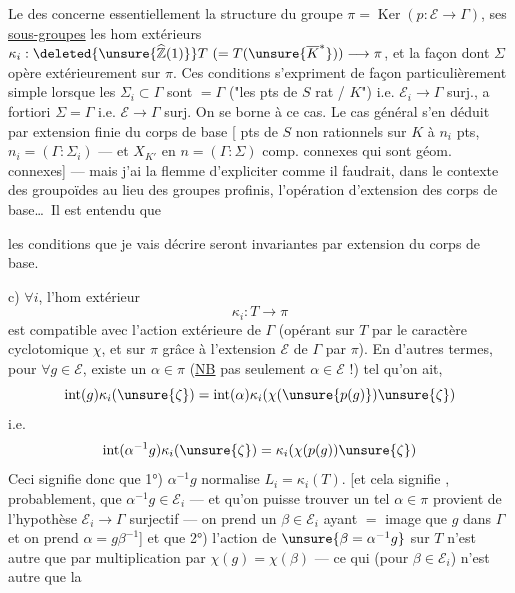 Le  des  concerne
essentiellement la structure du groupe \(\pi=\operatorname{Ker}(p:\mathcal E\to\Gamma)\),
ses  \uline{sous-groupes}
 les hom extérieurs
\(\kappa_i:\deleted{\unsure{\widehat{\mathbb Z}(1)}}T\ (=T(\unsure{\overline K^*}))\longrightarrow\pi\),
et la façon dont \(\Sigma\) opère extérieurement sur \(\pi\).
Ces conditions s'expriment de façon particulièrement simple lorsque les
\(\Sigma_i\subset\Gamma\) sont \(=\Gamma\)
("les pts de \(S\)  rat / \(K\)") i.e.
\(\mathcal E_i\to\Gamma\) surj., a fortiori \(\Sigma=\Gamma\) i.e.
\(\mathcal E\to\Gamma\) surj. On se borne à ce cas. Le cas général s'en déduit
par extension finie du corps de base
[  pts de
\(S\) non rationnels sur \(K\)
à \(n_i\) pts, 
\(n_i=(\Gamma:\Sigma_i)\) \unsure{\(\}\)} --- et \(X_{K'}\)
  en \(n=(\Gamma:\Sigma)\) comp. connexes
qui sont géom. connexes] --- mais j'ai la flemme d'expliciter comme il faudrait,
dans le contexte des groupoïdes au  lieu des groupes
profinis, l'opération d'extension des corps de base\ldots\ Il est entendu que


les conditions que je vais décrire seront invariantes par extension du corps de base.


c) \(\forall i\), l'hom extérieur
\[
\kappa_i:T\longrightarrow\pi
\]
est compatible avec l'action extérieure de \(\Gamma\) (opérant sur \(T\) par le
caractère cyclotomique \(\chi\), et sur \(\pi\) grâce à l'extension \(\mathcal E\)
de \(\Gamma\) par \(\pi\)). En d'autres termes, pour \(\forall g\in\mathcal E\),
existe un \uline{\(\alpha\in\pi\)} (\uline{NB} pas seulement
\(\alpha\in\mathcal E\) !) tel qu'on ait,
\[
\operatorname{int}(g)\kappa_i(\unsure{\zeta})
=\operatorname{int}(\alpha)\kappa_i(\chi(\unsure{p(g)})\unsure{\zeta})
\]
i.e.
\[
\operatorname{int}(\alpha^{-1}g)\kappa_i(\unsure{\zeta})
=\kappa_i(\chi(p(g))\unsure{\zeta})
\]
Ceci signifie donc que 1°) \(\alpha^{-1}g\) normalise \(L_i=\kappa_i(T)\).
[et cela signifie \unsure{\(=\)}, probablement, que \(\alpha^{-1}g\in\mathcal E_i\)
--- et qu'on puisse trouver un tel \(\alpha\in\pi\)
 provient de l'hypothèse
\(\mathcal E_i\to\Gamma\) surjectif --- on prend un \(\beta\in\mathcal E_i\)
 ayant \(=\) image que \(g\) dans \(\Gamma\)
et on prend \(\alpha=g\beta^{-1}\)] et que 2°) l'action  de
\(\unsure{\beta=\alpha^{-1}g}\) sur \(T\) n'est autre que par multiplication
par \(\chi(g)=\chi(\beta)\) --- ce qui (pour \(\beta\in\mathcal E_i\)) n'est autre que la

